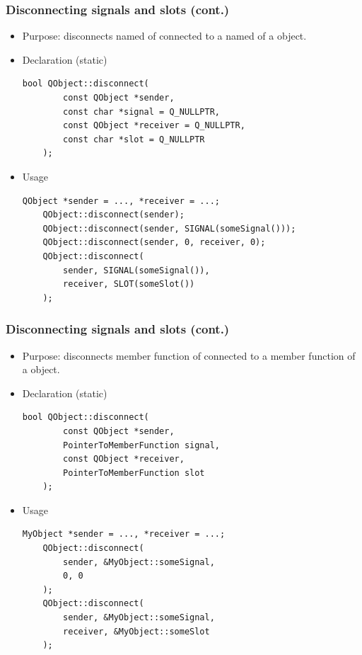 \begin{frame}[fragile]
  \frametitle{Disconnecting signals and slots (cont.)}
   \small
   \begin{itemize}
      \item Purpose: disconnects named \verb@signal@ of \verb@sender@
        connected to a named \verb@slot@ of a \verb@receiver@ object.
      \item Declaration (static)
      \begin{lstlisting}[basicstyle=\scriptsize\ttfamily]
	bool QObject::disconnect(
	    const QObject *sender,
	    const char *signal = Q_NULLPTR,
	    const QObject *receiver = Q_NULLPTR,
	    const char *slot = Q_NULLPTR
	);
      \end{lstlisting}
      \item Usage
      \begin{lstlisting}[basicstyle=\scriptsize\ttfamily]
	QObject *sender = ..., *receiver = ...;
	QObject::disconnect(sender);
	QObject::disconnect(sender, SIGNAL(someSignal()));
	QObject::disconnect(sender, 0, receiver, 0);
	QObject::disconnect(
	    sender, SIGNAL(someSignal()),
	    receiver, SLOT(someSlot())
	);
      \end{lstlisting}
    \end{itemize}
\end{frame}

\begin{frame}[fragile]
  \frametitle{Disconnecting signals and slots (cont.)}
   \small
   \begin{itemize}
      \item Purpose: disconnects \verb@signal@ member function of \verb@sender@
        connected to a \verb@slot@ member function of a \verb@receiver@ object.
      \item Declaration (static)
      \begin{lstlisting}[basicstyle=\scriptsize\ttfamily]
	bool QObject::disconnect(
	    const QObject *sender,
	    PointerToMemberFunction signal,
	    const QObject *receiver,
	    PointerToMemberFunction slot
	);
      \end{lstlisting}
      \item Usage
      \begin{lstlisting}[basicstyle=\scriptsize\ttfamily]
	MyObject *sender = ..., *receiver = ...;
	QObject::disconnect(
	    sender, &MyObject::someSignal,
	    0, 0
	);
	QObject::disconnect(
	    sender, &MyObject::someSignal,
	    receiver, &MyObject::someSlot
	);
      \end{lstlisting}
    \end{itemize}
\end{frame}

